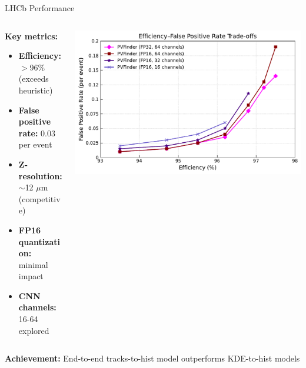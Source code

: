 \documentclass[10pt,aspectratio=169]{beamer}
\begin{document}
\begin{frame}{LHCb Performance}
  \begin{columns}[T]
    \begin{column}{0.55\textwidth}
      \textbf{Key metrics:}
      \begin{itemize}
        \item \textbf{Efficiency:} $>$96\% (exceeds heuristic)
        \item \textbf{False positive rate:} 0.03 per event
        \item \textbf{Z-resolution:} $\sim$12 $\mu$m (competitive)
        \item \textbf{FP16 quantization:} minimal impact
        \item \textbf{CNN channels:} 16-64 explored
      \end{itemize}
    \end{column}

    \begin{column}{0.45\textwidth}
\includegraphics[width=1.0\textwidth]{figures/pvfinder_performance.pdf}
    \end{column}
  \end{columns}

  \pause
  \vspace{-0.1cm}
  \textbf{Achievement:} End-to-end tracks-to-hist model outperforms KDE-to-hist models
\end{frame}
\end{document}
